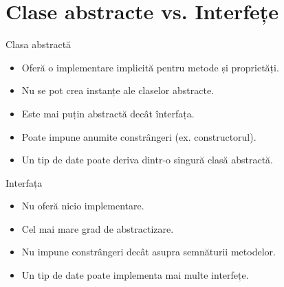 \documentclass[presentation]{beamer}
\begin{document}
\section{Clase abstracte vs. Interfețe}
\label{sec:orgcd3e470}
\begin{frame}[label={sec:org04e60d3}]{Clasa abstractă}
\begin{itemize}
\item Oferă o implementare implicită pentru metode și proprietăți.
\item Nu se pot crea instanțe ale claselor abstracte.
\item Este mai puțin abstractă decât înterfața.
\item Poate impune anumite constrângeri (ex. constructorul).
\item Un tip de date poate deriva dintr-o singură clasă abstractă.
\end{itemize}
\end{frame}
\begin{frame}[label={sec:orga57aaf5}]{Interfața}
\begin{itemize}
\item Nu oferă nicio implementare.
\item Cel mai mare grad de abstractizare.
\item Nu impune constrângeri decât asupra semnăturii metodelor.
\item Un tip de date poate implementa mai multe interfețe.
\end{itemize}
\end{frame}
\end{document}
